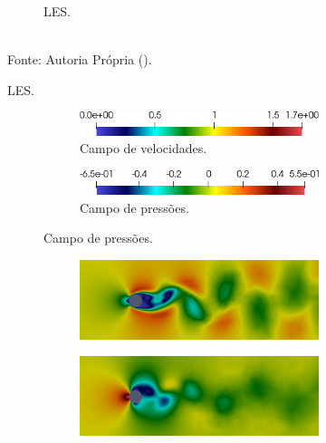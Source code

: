 \begin{figure}[h!]
\begin{subfigure}{\textwidth}
\begin{subfigure}{.42\textwidth}
        \end{subfigure}
        \caption{LES.}
    \end{subfigure}
    \\Fonte: Autoria Própria (\the\year).
    \label{fig:cyl-res1}
\end{figure}

\begin{figure}[h!]
    \centering
    \caption{Resultados no instante $t=120$.}
    \begin{subfigure}{\textwidth}\centering
        \begin{subfigure}{.42\textwidth}
            \caption*{Campo de velocidades.}
            \includegraphics[width=\linewidth]{Figuras/cylinder/Legenda-vel.png}
        \end{subfigure}
        \begin{subfigure}{.42\textwidth}
            \caption*{Campo de pressões.}
            \includegraphics[width=\linewidth]{Figuras/cylinder/Legenda-pre.png}
        \end{subfigure}
    \end{subfigure}
    \begin{subfigure}{\textwidth}\centering
        \begin{subfigure}{.42\textwidth}
            \includegraphics[width=\linewidth]{Figuras/cylinder/VMS-Lin2-vel.png}
        \end{subfigure}
        \begin{subfigure}{.42\textwidth}
            \includegraphics[width=\linewidth]{Figuras/cylinder/VMS-Lin2-pre.png}

\end{subfigure}
\end{subfigure}
\end{figure}

